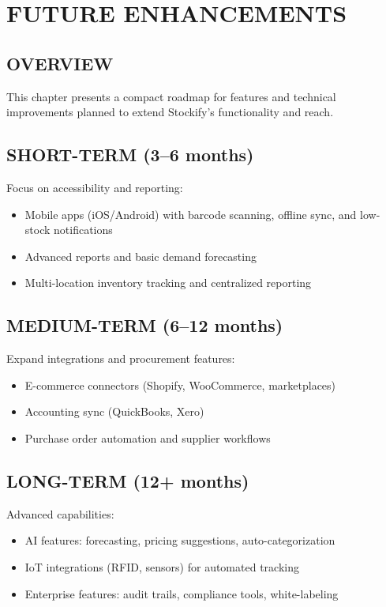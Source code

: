 
\chapter{FUTURE ENHANCEMENTS}

\section{OVERVIEW}

This chapter presents a compact roadmap for features and technical improvements planned to extend Stockify's functionality and reach.

\section{SHORT-TERM (3–6 months)}

Focus on accessibility and reporting:
\begin{itemize}
	\item Mobile apps (iOS/Android) with barcode scanning, offline sync, and low-stock notifications
	\item Advanced reports and basic demand forecasting
	\item Multi-location inventory tracking and centralized reporting
\end{itemize}

\section{MEDIUM-TERM (6–12 months)}

Expand integrations and procurement features:
\begin{itemize}
	\item E-commerce connectors (Shopify, WooCommerce, marketplaces)
	\item Accounting sync (QuickBooks, Xero)
	\item Purchase order automation and supplier workflows
\end{itemize}

\section{LONG-TERM (12+ months)}

Advanced capabilities:
\begin{itemize}
	\item AI features: forecasting, pricing suggestions, auto-categorization
	\item IoT integrations (RFID, sensors) for automated tracking
	\item Enterprise features: audit trails, compliance tools, white-labeling
\end{itemize}

